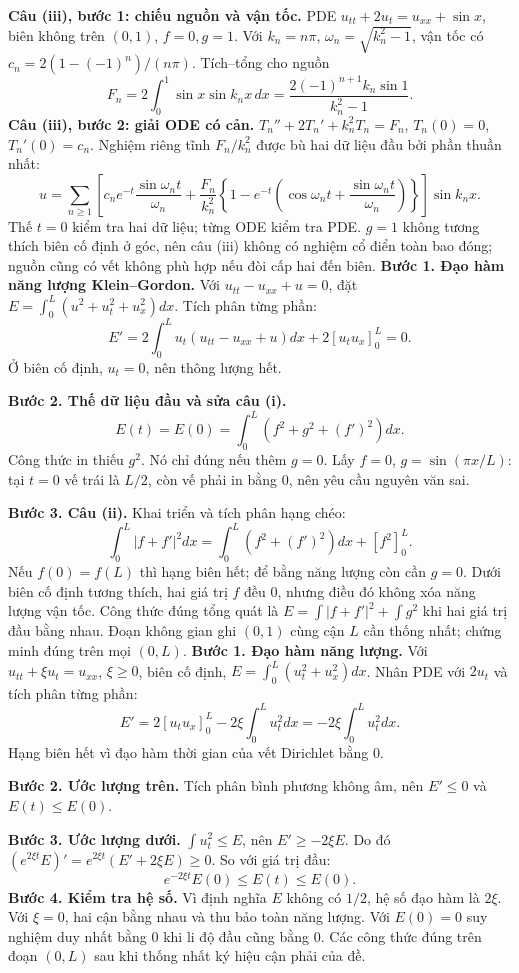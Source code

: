 \textbf{Câu (iii), bước 1: chiếu nguồn và vận tốc.} PDE $u_{tt}+2u_t=u_{xx}+\sin x$, biên không trên $(0,1)$, $f=0,g=1$. Với $k_n=n\pi$, $\omega_n=\sqrt{k_n^2-1}$, vận tốc có $c_n=2(1-(-1)^n)/(n\pi)$. Tích–tổng cho nguồn
\[F_n=2\int_0^1\sin x\sin k_nx\,dx=\frac{2(-1)^{n+1}k_n\sin1}{k_n^2-1}.\]
\textbf{Câu (iii), bước 2: giải ODE có cản.} $T_n''+2T_n'+k_n^2T_n=F_n$, $T_n(0)=0$, $T_n'(0)=c_n$. Nghiệm riêng tĩnh $F_n/k_n^2$ được bù hai dữ liệu đầu bởi phần thuần nhất:
\[u=\sum_{n\ge1}\left[c_ne^{-t}\frac{\sin\omega_nt}{\omega_n}+\frac{F_n}{k_n^2}\left\{1-e^{-t}\left(\cos\omega_nt+\frac{\sin\omega_nt}{\omega_n}\right)\right\}\right]\sin k_nx.\]
Thế $t=0$ kiểm tra hai dữ liệu; từng ODE kiểm tra PDE. $g=1$ không tương thích biên cố định ở góc, nên câu (iii) không có nghiệm cổ điển toàn bao đóng; nguồn cũng có vết không phù hợp nếu đòi cấp hai đến biên.
\textbf{Bước 1. Đạo hàm năng lượng Klein–Gordon.} Với $u_{tt}-u_{xx}+u=0$, đặt $E=\int_0^L(u^2+u_t^2+u_x^2)dx$. Tích phân từng phần:
\[E'=2\int_0^Lu_t(u_{tt}-u_{xx}+u)dx+2[u_tu_x]_0^L=0.\]
Ở biên cố định, $u_t=0$, nên thông lượng hết.

\textbf{Bước 2. Thế dữ liệu đầu và sửa câu (i).}
\[E(t)=E(0)=\int_0^L(f^2+g^2+(f')^2)dx.\]
Công thức in thiếu $g^2$. Nó chỉ đúng nếu thêm $g=0$. Lấy $f=0$, $g=\sin(\pi x/L)$: tại $t=0$ vế trái là $L/2$, còn vế phải in bằng $0$, nên yêu cầu nguyên văn sai.

\textbf{Bước 3. Câu (ii).} Khai triển và tích phân hạng chéo:
\[\int_0^L|f+f'|^2dx=\int_0^L(f^2+(f')^2)dx+[f^2]_0^L.\]
Nếu $f(0)=f(L)$ thì hạng biên hết; để bằng năng lượng còn cần $g=0$. Dưới biên cố định tương thích, hai giá trị $f$ đều $0$, nhưng điều đó không xóa năng lượng vận tốc. Công thức đúng tổng quát là $E=\int|f+f'|^2+\int g^2$ khi hai giá trị đầu bằng nhau. Đoạn không gian ghi $(0,1)$ cùng cận $L$ cần thống nhất; chứng minh đúng trên mọi $(0,L)$.
\textbf{Bước 1. Đạo hàm năng lượng.} Với $u_{tt}+\xi u_t=u_{xx}$, $\xi\ge0$, biên cố định, $E=\int_0^L(u_t^2+u_x^2)dx$. Nhân PDE với $2u_t$ và tích phân từng phần:
\[E'=2[u_tu_x]_0^L-2\xi\int_0^Lu_t^2dx=-2\xi\int_0^Lu_t^2dx.\]
Hạng biên hết vì đạo hàm thời gian của vết Dirichlet bằng $0$.

\textbf{Bước 2. Ước lượng trên.} Tích phân bình phương không âm, nên $E'\le0$ và $E(t)\le E(0)$.

\textbf{Bước 3. Ước lượng dưới.} $\int u_t^2\le E$, nên $E'\ge-2\xi E$. Do đó $(e^{2\xi t}E)'=e^{2\xi t}(E'+2\xi E)\ge0$. So với giá trị đầu:
\[e^{-2\xi t}E(0)\le E(t)\le E(0).\]
\textbf{Bước 4. Kiểm tra hệ số.} Vì định nghĩa $E$ không có $1/2$, hệ số đạo hàm là $2\xi$. Với $\xi=0$, hai cận bằng nhau và thu bảo toàn năng lượng. Với $E(0)=0$ suy nghiệm duy nhất bằng $0$ khi li độ đầu cũng bằng $0$. Các công thức đúng trên đoạn $(0,L)$ sau khi thống nhất ký hiệu cận phải của đề.
